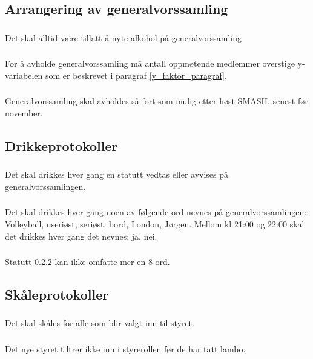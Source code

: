 \documentclass{article}
\newenvironment{statute}[1][]
    {
        \titleformat{\subsubsection}[runin]{\normalfont}{\hspace{1pt}\textit{\S\hspace{5pt}\thesubsubsection}}{0pt}{\rule{4pt}{0pt}}{}
        \subsubsection{}#1
        \begin{minipage}[t]{0.89\linewidth}
    }
    {
        \end{minipage}
        
        \ignorespacesafterend
    }
\begin{document}
        \subsection{Arrangering av generalvorssamling}
            \begin{statute}
                Det skal alltid være tillatt å nyte alkohol på generalvorssamling
            \end{statute}
            \begin{statute} 
                For å avholde generalvorssamling må antall oppmøtende medlemmer overstige y-variabelen som er beskrevet i paragraf \ref{y_faktor_paragraf}.
            \end{statute}
            \begin{statute}
                Generalvorssamling skal avholdes så fort som mulig etter høst-SMASH, senest før november.
            \end{statute}
            
        \subsection{Drikkeprotokoller}
            \begin{statute}
                Det skal drikkes hver gang en statutt vedtas eller avvises på generalvorssamlingen.
            \end{statute}
            \begin{statute}[\label{drikkeprotokoll_forbudte_ord}]
                Det skal drikkes hver gang noen av følgende ord nevnes på generalvorssamlingen: Volleyball, useriøst, seriøst, bord, London, Jørgen. Mellom kl 21:00 og 22:00 skal det drikkes hver gang det nevnes: ja, nei.
            \end{statute}
        	\begin{statute}
        		Statutt \ref{drikkeprotokoll_forbudte_ord} kan ikke omfatte mer en 8 ord.
        	\end{statute}
            
        \subsection{Skåleprotokoller}
            \begin{statute}
                Det skal skåles for alle som blir valgt inn til styret.
            \end{statute}
            \begin{statute}
                Det nye styret tiltrer ikke inn i styrerollen før de har tatt lambo.
            \end{statute}            
\end{document}

